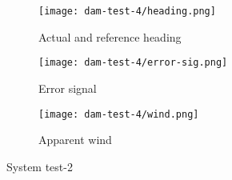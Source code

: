 \begin{figure}[h!]
    \centering
    \begin{subfigure}{=0.75\linewidth}
        \centering
        \texttt{[image: dam-test-4/heading.png]}
        \caption{Actual and reference heading}
        \label{subfig:system-2-heading}
    \end{subfigure}

    \begin{subfigure}{=0.75\linewidth}
        \centering
        \texttt{[image: dam-test-4/error-sig.png]}
        \caption{Error signal}
        \label{subfig:system-2-error}
    \end{subfigure}

    \begin{subfigure}{=0.75\linewidth}
        \centering
        \texttt{[image: dam-test-4/wind.png]}
        \caption{Apparent wind}
        \label{subfig:system-2-wind}
    \end{subfigure}

    \caption[System test-2]{System test-2}
    \label{fig:system-2-water}
\end{figure}

